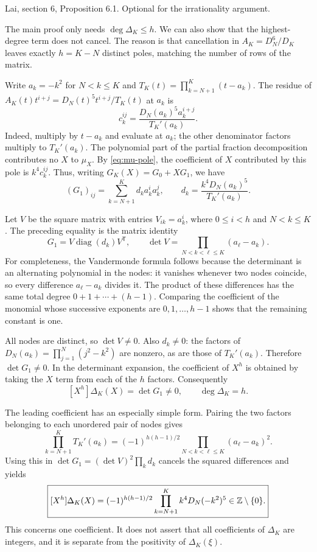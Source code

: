 \newpage
{}
{Lai, section 6, Proposition 6.1. Optional for the irrationality argument.}

The main proof only needs $\deg\Delta_K\leq h$. We can also show that
the highest-degree term does not cancel. The reason is that cancellation
in $A_K=D_N^6/D_K$ leaves exactly $h=K-N$ distinct poles, matching the
number of rows of the matrix.

Write $a_k=-k^2$ for $N<k\leq K$ and
$T_K(t)=\prod_{k=N+1}^K(t-a_k)$. The residue of
$A_K(t)t^{i+j}=D_N(t)^5t^{i+j}/T_K(t)$ at $a_k$ is
\[
 c_k^{ij}=\frac{D_N(a_k)^5a_k^{i+j}}{T_K'(a_k)}.
\]
Indeed, multiply by $t-a_k$ and evaluate at $a_k$; the other denominator
factors multiply to $T_K'(a_k)$. The polynomial part of the partial
fraction decomposition contributes no $X$ to $\mu_X$. By
\eqref{eq:mu-pole}, the coefficient of $X$ contributed by this pole
is $k^4c_k^{ij}$. Thus, writing $G_K(X)=G_0+XG_1$, we have
\[
 (G_1)_{ij}=\sum_{k=N+1}^K d_ka_k^ia_k^j,
 \qquad d_k=\frac{k^4D_N(a_k)^5}{T_K'(a_k)}.
\]

Let $V$ be the square matrix with entries $V_{ik}=a_k^i$, where
$0\leq i<h$ and $N<k\leq K$. The preceding equality is the matrix identity
\[
 G_1=V\operatorname{diag}(d_k)V^{\mathsf T},\qquad
 \det V=\prod_{N<k<\ell\leq K}(a_\ell-a_k).
\]
For completeness, the Vandermonde formula follows because the determinant
is an alternating polynomial in the nodes: it vanishes whenever two nodes
coincide, so every difference $a_\ell-a_k$ divides it. The product of these
differences has the same total degree $0+1+\cdots+(h-1)$. Comparing the
coefficient of the monomial whose successive exponents are
$0,1,\ldots,h-1$ shows that the remaining constant is one.

All nodes are distinct, so $\det V\ne0$. Also $d_k\ne0$: the factors
of $D_N(a_k)=\prod_{j=1}^N(j^2-k^2)$ are nonzero, as are those of
$T_K'(a_k)$. Therefore $\det G_1\ne0$. In the determinant expansion,
the coefficient of $X^h$ is obtained by taking the $X$ term from each of
the $h$ factors. Consequently
\[
 [X^h]\Delta_K(X)=\det G_1\ne0,\qquad \deg\Delta_K=h.
\]

The leading coefficient has an especially simple form. Pairing the two
factors belonging to each unordered pair of nodes gives
\[
 \prod_{k=N+1}^K T_K'(a_k)
 =(-1)^{h(h-1)/2}\prod_{N<k<\ell\leq K}(a_\ell-a_k)^2.
\]
Using this in $\det G_1=(\det V)^2\prod_k d_k$ cancels the squared
differences and yields
\[
 \boxed{[X^h]\Delta_K(X)
 =(-1)^{h(h-1)/2}\prod_{k=N+1}^K k^4D_N(-k^2)^5
 \in\mathbb Z\setminus\{0\}.}
\]
This concerns one coefficient. It does not assert that all coefficients
of $\Delta_K$ are integers, and it is separate from the positivity of
$\Delta_K(\xi)$.

